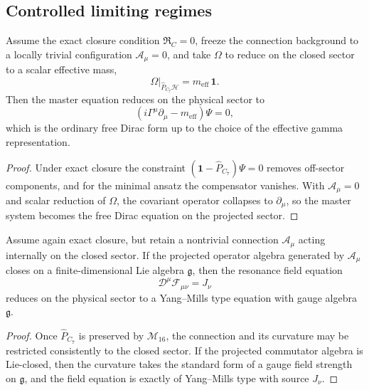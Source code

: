 \subsection*{Controlled limiting regimes}

\begin{proposition}
\label{prop:dirac-limit}
Assume the exact closure condition $\mathfrak R_C=0$, freeze the connection
background to a locally trivial configuration $\mathcal A_\mu=0$, and take
$\Omega$ to reduce on the closed sector to a scalar effective mass,
\[
  \Omega\big|_{\hat P_{C_7}\mathcal H}
  = m_{\mathrm{eff}}\,\mathbf 1.
\]
Then the master equation reduces on the physical sector to
\[
  (i\Gamma^\mu\partial_\mu - m_{\mathrm{eff}})\Psi = 0,
\]
which is the ordinary free Dirac form up to the choice of the effective
gamma representation.
\end{proposition}

\begin{proof}
Under exact closure the constraint $(\mathbf 1-\hat P_{C_7})\Psi=0$ removes
off-sector components, and for the minimal ansatz the compensator vanishes.
With $\mathcal A_\mu=0$ and scalar reduction of $\Omega$, the covariant
operator collapses to $\partial_\mu$, so the master system becomes the free
Dirac equation on the projected sector.
\end{proof}

\begin{proposition}
\label{prop:yang-mills-limit}
Assume again exact closure, but retain a nontrivial connection
$\mathcal A_\mu$ acting internally on the closed sector.
If the projected operator algebra generated by $\mathcal A_\mu$ closes on a
finite-dimensional Lie algebra $\mathfrak g$, then the resonance field
equation
\[
  \mathcal D^\mu \mathcal F_{\mu\nu}=J_\nu
\]
reduces on the physical sector to a Yang--Mills type equation with gauge
algebra $\mathfrak g$.
\end{proposition}

\begin{proof}
Once $\hat P_{C_7}$ is preserved by $\mathcal M_{16}$, the connection and its
curvature may be restricted consistently to the closed sector.
If the projected commutator algebra is Lie-closed, then the curvature takes
the standard form of a gauge field strength on $\mathfrak g$, and the field
equation is exactly of Yang--Mills type with source $J_\nu$.
\end{proof}

